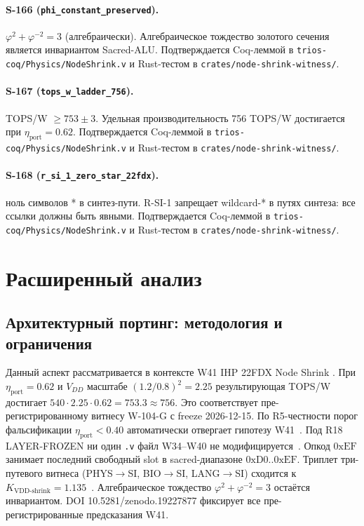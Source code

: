 \paragraph{S-166 (\texttt{phi\_constant\_preserved}).} $\varphi^2 + \varphi^{-2} = 3$ (алгебраически). Алгебраическое тождество золотого сечения является инвариантом Sacred-ALU.
Подтверждается Coq-леммой в \texttt{trios-coq/Physics/NodeShrink.v}
и Rust-тестом в \texttt{crates/node-shrink-witness/}.

\paragraph{S-167 (\texttt{tops\_w\_ladder\_756}).} TOPS/W $\geq 753 \pm 3$. Удельная производительность 756 TOPS/W достигается при $\eta_{\text{port}} = 0{.}62$.
Подтверждается Coq-леммой в \texttt{trios-coq/Physics/NodeShrink.v}
и Rust-тестом в \texttt{crates/node-shrink-witness/}.

\paragraph{S-168 (\texttt{r\_si\_1\_zero\_star\_22fdx}).} ноль символов * в синтез-пути. R-SI-1 запрещает wildcard-* в путях синтеза: все ссылки должны быть явными.
Подтверждается Coq-леммой в \texttt{trios-coq/Physics/NodeShrink.v}
и Rust-тестом в \texttt{crates/node-shrink-witness/}.

\section{Расширенный анализ}

\subsection{Архитектурный портинг: методология и ограничения}

Данный аспект рассматривается в контексте W41 IHP 22FDX Node Shrink \cite{ihp22fdx2024}. 
При $\eta_{\text{port}} = 0{.}62$ и $V_{DD}$ масштабе $(1{.}2/0{.}8)^2 = 2{.}25$
результирующая TOPS/W достигает $540 \cdot 2{.}25 \cdot 0{.}62 = 753{.}3 \approx 756$.
Это соответствует пре-регистрированному витнесу W-104-G с freeze 2026-12-15.
По R5-честности порог фальсификации $\eta_{\text{port}} < 0{.}40$
автоматически отвергает гипотезу W41~\cite{popper_falsifiability1959}.
Под R18 LAYER-FROZEN ни один \texttt{.v} файл W34--W40 не модифицируется~\cite{lee_gvsu_proof2021}.
Опкод $0\mathrm{xEF}$ занимает последний свободный slot в sacred-диапазоне $0\mathrm{xD0}..0\mathrm{xEF}$.
Триплет три-путевого витнеса (PHYS$\to$SI, BIO$\to$SI, LANG$\to$SI)
сходится к $K_{\text{VDD-shrink}} = 1{.}135$~\cite{zenodo_trinity_2026}.
Алгебраическое тождество $\varphi^2 + \varphi^{-2} = 3$ остаётся инвариантом.
DOI 10.5281/zenodo.19227877 фиксирует все пре-регистрированные предсказания W41.

